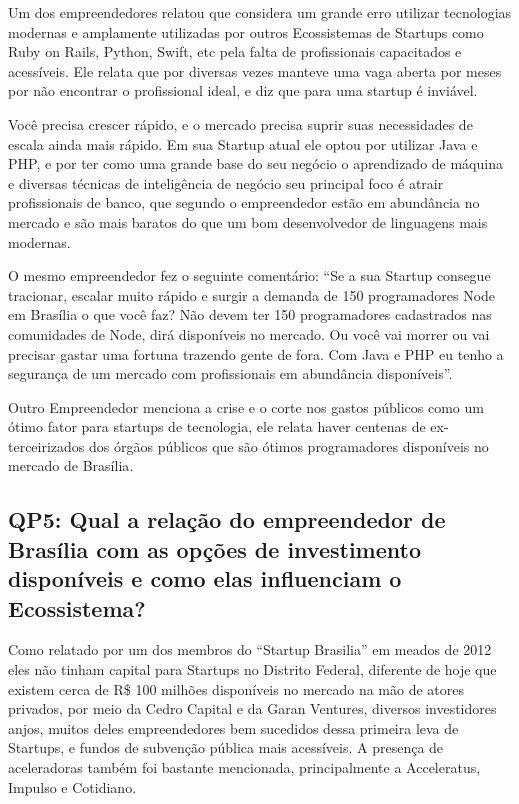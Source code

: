 Um dos empreendedores relatou que considera um grande erro utilizar tecnologias modernas e amplamente utilizadas por outros Ecossistemas de Startups como Ruby on Rails, Python, Swift, etc pela falta de profissionais capacitados e acessíveis. Ele relata que por diversas vezes manteve uma vaga aberta por meses por não encontrar o profissional ideal, e diz que para uma startup é inviável. 

Você precisa crescer rápido, e o mercado precisa suprir suas necessidades de escala ainda mais rápido. Em sua Startup atual ele optou por utilizar Java e PHP, e por ter como uma grande base do seu negócio o aprendizado de máquina e diversas técnicas de inteligência de negócio seu principal foco é atrair profissionais de banco, que segundo o empreendedor estão em abundância no mercado e são mais baratos do que um bom desenvolvedor de linguagens mais modernas. 

O mesmo empreendedor fez o seguinte comentário: ``Se a sua Startup consegue tracionar, escalar muito rápido e surgir a demanda de 150 programadores Node em Brasília o que você faz? Não devem ter 150 programadores cadastrados nas comunidades de Node, dirá disponíveis no mercado. Ou você vai morrer ou vai precisar gastar uma fortuna trazendo gente de fora. Com Java e PHP eu tenho a segurança de um mercado com profissionais em abundância disponíveis''.

Outro Empreendedor menciona a crise e o corte nos gastos públicos como um ótimo fator para startups de tecnologia, ele relata haver centenas de ex-terceirizados dos órgãos públicos que são ótimos programadores disponíveis no mercado de Brasília.

\subsection{QP5: Qual a relação do empreendedor de Brasília com as opções de investimento disponíveis e como elas influenciam o Ecossistema?}
\label{subsection:pergunta_de_pesquisa_5}

Como relatado por um dos membros do ``Startup Brasilia'' em meados de 2012 eles não tinham capital para Startups no Distrito Federal, diferente de hoje que existem cerca de R\$ 100 milhões disponíveis no mercado na mão de atores privados, por meio da Cedro Capital e da Garan Ventures, diversos investidores anjos, muitos deles empreendedores bem sucedidos dessa primeira leva de Startups, e fundos de subvenção pública mais acessíveis. A presença de aceleradoras também foi bastante mencionada, principalmente a Acceleratus, Impulso e Cotidiano. 

